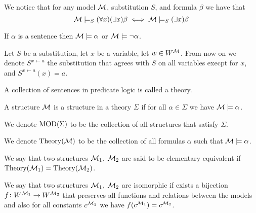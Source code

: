 \documentclass[11pt,a4paper]{article}
\begin{document}
  \begin{remark}
    We notice that for any model $\mathcal{M}$, substitution $S$, and formula $\beta$
    we have that
    \[
      \mathcal{M} \models_S (\forall x)(\exists x) \beta \iff
      \mathcal{M} \models_S (\exists x) \beta
    \]
  \end{remark}

  \begin{corollary}
    If $\alpha$ is a sentence then $\mathcal{M} \models \alpha$ or 
    $\mathcal{M} \models \neg \alpha$.
  \end{corollary}

  \begin{remark}
    Let $S$ be a substitution, let $x$ be a variable, let $w \in W^{\mathcal{M}}$.
    From now on we denote $S^{x \gets a}$ the substitution that agrees
    with $S$ on all variables execpt for $x$, and $S^{x \gets a}(x) = a$.
  \end{remark}


  \begin{definition}[Theory]
    A collection of sentences in predicate logic is called a theory.
  \end{definition}

  \begin{definition}
    A structure $\mathcal{M}$ is a structure in a theory $\Sigma$ if for all
    $\alpha \in \Sigma$ we have $\mathcal{M} \models \alpha$.
  \end{definition}

  \begin{remark}
    We denote $\operatorname{MOD}(\Sigma)$ to be the collection of all structures that
    satisfy $\Sigma$.
  \end{remark}

  \begin{remark}
    We denote $\operatorname{Theory}(\mathcal{M})$ to be the collection of all formulas $\alpha$
    such that $\mathcal{M} \models \alpha$.
  \end{remark}

  \begin{definition}
    We say that two structures $\mathcal{M}_1$, $\mathcal{M}_2$ are said to be elementary 
    equivalent if $\operatorname{Theory}(\mathcal{M}_1) = \operatorname{Theory}(\mathcal{M}_2)$.
  \end{definition}

  \begin{definition}
    We say that two structures $\mathcal{M}_1$, $\mathcal{M}_2$ are isomorphic
    if exists a bijection $f \colon W^{\mathcal{M}_1} \to W^{\mathcal{M}_2}$ that preserves
    all functions and relations between the models and also
    for all constants $c^{\mathcal{M}_1}$ we have $f(c^{\mathcal{M}_1}) = c^{\mathcal{M}_2}$.
  \end{definition}
\end{document}
